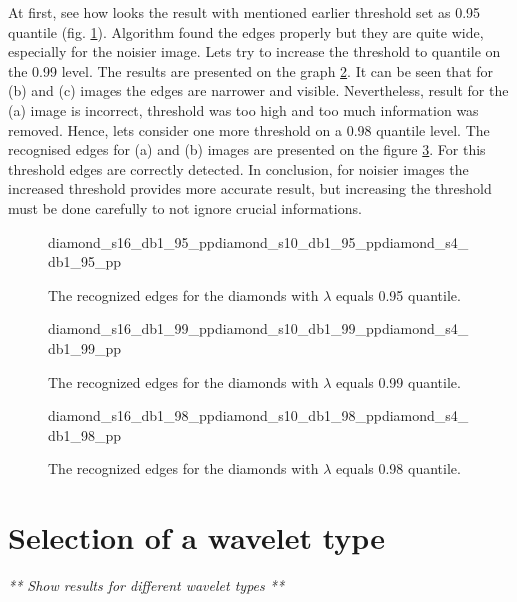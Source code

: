 At first, see how looks the result with mentioned earlier threshold set as 0.95 quantile (fig. \ref{fig:diamonds_95}). Algorithm found the edges properly but they are quite wide, especially for the noisier image. Lets try to increase the threshold to quantile on the 0.99 level. The results are presented on the graph \ref{fig:diamonds_99}. It can be seen that for (b) and (c) images the edges are narrower and visible. Nevertheless, result for the (a) image is incorrect, threshold was too high and too much information was removed. Hence, lets consider one more threshold on a 0.98 quantile level. The recognised edges for (a) and (b) images are presented on the figure \ref{fig:diamonds_98}. For this threshold edges are correctly detected. In conclusion, for noisier images the increased threshold provides more accurate result, but increasing the threshold must be done carefully to not ignore crucial informations.

\begin{figure}[h]
	\begin{subdiagrams3}{diamond_s16_db1_95_pp}{}{diamond_s10_db1_95_pp}{}{diamond_s4_db1_95_pp}{}
	\end{subdiagrams3}
	\centering
	\caption{The recognized edges for the diamonds with $\lambda$ equals 0.95 quantile.}
	\label{fig:diamonds_95}
\end{figure}

\begin{figure}[h]
	\begin{subdiagrams3}{diamond_s16_db1_99_pp}{}{diamond_s10_db1_99_pp}{}{diamond_s4_db1_99_pp}{}
	\end{subdiagrams3}
	\centering
	\caption{The recognized edges for the diamonds with $\lambda$ equals 0.99 quantile.}
	\label{fig:diamonds_99}
\end{figure}

\begin{figure}[h]
	\begin{subdiagrams3}{diamond_s16_db1_98_pp}{}{diamond_s10_db1_98_pp}{}{diamond_s4_db1_98_pp}{}
	\end{subdiagrams3}
	\centering
	\caption{The recognized edges for the diamonds with $\lambda$ equals 0.98 quantile.}
	\label{fig:diamonds_98}
\end{figure}


\section{Selection of a wavelet type}

\textit{** Show results for different wavelet types **}